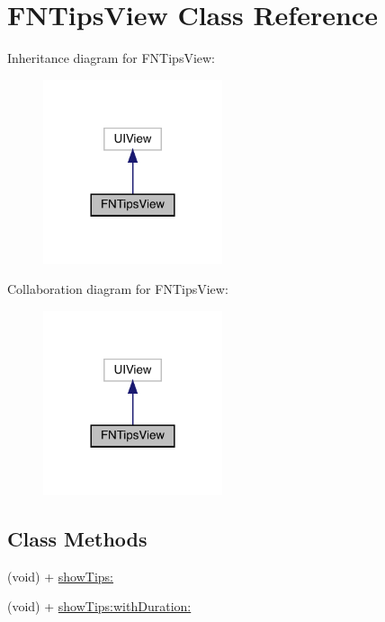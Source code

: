 \hypertarget{interface_f_n_tips_view}{}\section{F\+N\+Tips\+View Class Reference}
\label{interface_f_n_tips_view}


Inheritance diagram for F\+N\+Tips\+View\+:\nopagebreak
\begin{figure}[H]
\begin{center}
\leavevmode
\includegraphics[width=149pt]{interface_f_n_tips_view__inherit__graph}
\end{center}
\end{figure}


Collaboration diagram for F\+N\+Tips\+View\+:\nopagebreak
\begin{figure}[H]
\begin{center}
\leavevmode
\includegraphics[width=149pt]{interface_f_n_tips_view__coll__graph}
\end{center}
\end{figure}
\subsection*{Class Methods}
\begin{DoxyCompactItemize}
\item 
(void) + \mbox{\hyperlink{interface_f_n_tips_view_aaec0cc2cb74e097445d9c3efa66c597a}{show\+Tips\+:}}
\item 
(void) + \mbox{\hyperlink{interface_f_n_tips_view_ae67392c99f4502a7f480426538475bfc}{show\+Tips\+:with\+Duration\+:}}
\end{DoxyCompactItemize}


